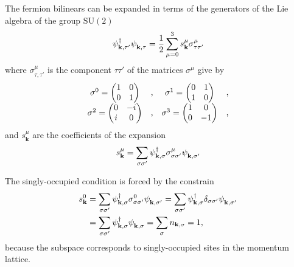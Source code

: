 \documentclass[english,aps,prd,nofootinbib,twocolumn]{revtex4-1}
\begin{document}
The fermion bilinears can be expanded in terms of the generators of the Lie algebra of the group $\mathrm{SU}(2)$
\begin{equation}
\psi_{\mathbf{k ,\tau'}}^{\textcolor{black}{\dagger}}
\psi_{\mathbf{k ,\tau }}^{\textcolor{white}{\dagger}} = 
\frac{1}{2}
\sum_{\mu=0}^{3} 
s^{\mu }_{\mathbf{k }}\sigma^{\mu }_{\tau \tau'}
\end{equation}
where $\sigma^{\mu }_{\tau ,\tau'}$ is the component $\tau\tau'$ of the matrices $\sigma^{\mu }$ give by
\begin{equation}
\begin{matrix}
\sigma^{0}_{\textcolor{white}{,}} = 
\begin{pmatrix}
1	&	0	\\	0	&	1
\end{pmatrix}	&	,	&	
\sigma^{1}_{\textcolor{white}{,}} = 
\begin{pmatrix}
0	&	1	\\	1	&	0
\end{pmatrix}	&	, \\
\sigma^{2}_{\textcolor{white}{,}} = 
\begin{pmatrix}
0	&	-i	\\	i	&	0
\end{pmatrix}	&	,	&	
\sigma^{3}_{\textcolor{white}{,}} = 
\begin{pmatrix}
1	&	0	\\	0	&	-1
\end{pmatrix}	&	,
\end{matrix}
\end{equation}
and $s^{\mu }_{\mathbf{k }}$ are the coefficients of the expansion
\begin{equation}
s^{\mu}_{\mathbf{k }} = \sum_{\sigma \sigma'} 
\psi_{\mathbf{k ,\sigma }}^{\textcolor{black}{\dagger}}
\sigma^{\mu }_{\sigma \sigma'}
\psi_{\mathbf{k ,\sigma'}}^{\textcolor{white}{\dagger}}
\end{equation}

The singly-occupied condition is forced by the constrain
\begin{equation}
\begin{split}
s^{0}_{\mathbf{k }} &= \sum_{\sigma \sigma'} 
\psi_{\mathbf{k ,\sigma }}^{\textcolor{black}{\dagger}}
\sigma^{0}_{\sigma \sigma'}
\psi_{\mathbf{k ,\sigma'}}^{\textcolor{white}{\dagger}} =
\sum_{\sigma \sigma'} 
\psi_{\mathbf{k ,\sigma }}^{\textcolor{black}{\dagger}}
\delta_{\sigma \sigma'}
\psi_{\mathbf{k ,\sigma'}}^{\textcolor{white}{\dagger}} \\ &=
\sum_{\sigma \sigma'} 
\psi_{\mathbf{k ,\sigma }}^{\textcolor{black}{\dagger}}
\psi_{\mathbf{k ,\sigma }}^{\textcolor{white}{\dagger}} =
\sum_{\sigma } 
n_{\mathbf{k ,\sigma }} = 
1,
\end{split}
\end{equation}
because the subspace corresponds to singly-occupied sites in the momentum lattice. 
\end{document}
